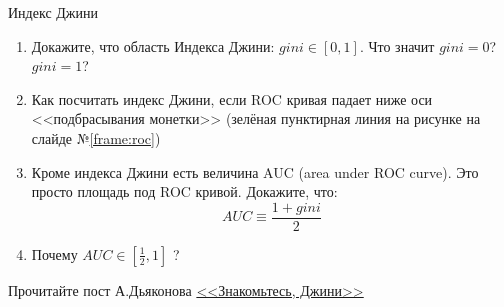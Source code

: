 \begin{frame}{Индекс Джини}
	\begin{enumerate}
		\item Докажите, что область Индекса Джини: $gini \in [0,1]$. 
		Что значит $gini = 0$? $gini = 1$?
		\item Как посчитать индекс Джини, если ROC кривая падает ниже оси <<подбрасывания монетки>> (зелёная пунктирная линия на рисунке на слайде №\ref{frame:roc})
		\item Кроме индекса Джини есть величина AUC (area under ROC curve). 
		Это просто площадь под ROC кривой. Докажите, что:
		\begin{equation}
		AUC \equiv \frac{1+gini}{2} 
		\end{equation}
		\item Почему $AUC \in [\frac{1}{2}, 1]$ ?
	\end{enumerate}
	Прочитайте пост А.Дьяконова
	\href{https://dyakonov.org/2015/12/15/\%D0\%B7\%D0\%BD\%D0\%B0\%D0\%BA\%D0\%BE\%D0\%BC\%D1\%8C\%D1\%82\%D0\%B5\%D1\%81\%D1\%8C-\%D0\%B4\%D0\%B6\%D0\%B8\%D0\%BD\%D0\%B8/}{<<Знакомьтесь, Джини>>}
\end{frame}
  

